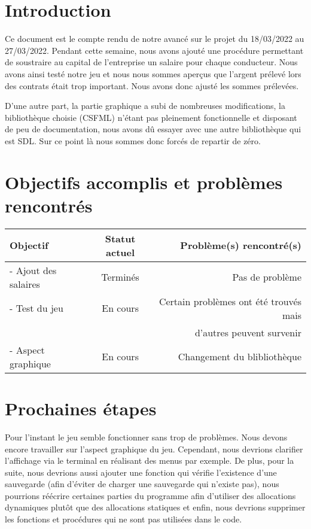 \documentclass[a4paper, 12pt]{article}
\begin{document}
\newpage



\section*{Introduction}
      Ce document est le compte rendu de notre avancé sur le projet du 18/03/2022 au 27/03/2022. Pendant cette semaine, nous avons ajouté une procédure permettant de soustraire au capital de l'entreprise un salaire pour chaque conducteur. Nous avons ainsi testé notre jeu et nous nous sommes aperçus que l'argent prélevé lors des contrats était trop important. Nous avons donc ajusté les sommes prélevées.

      D'une autre part, la partie graphique a subi de nombreuses modifications, la bibliothèque choisie (CSFML) n'étant pas pleinement fonctionnelle et disposant de peu de documentation, nous avons dû essayer avec une autre bibliothèque qui est SDL. Sur ce point là nous sommes donc forcés de repartir de zéro. 

\section{Objectifs accomplis et problèmes rencontrés}
     \begin{tabular}{|l|c|r|}
  \hline
  Objectif & Statut actuel & Problème(s) rencontré(s) \\
  \hline
   - Ajout des salaires & Terminés & Pas de problème \\
   - Test du jeu & En cours & Certain problèmes ont été trouvés mais \\
    &  & d'autres peuvent survenir \\
     - Aspect graphique & En cours & Changement du blibliothèque \\
  
  

  \hline
\end{tabular}
\section{Prochaines étapes}
    Pour l'instant le jeu semble fonctionner sans trop de problèmes. Nous devons encore travailler sur l'aspect graphique du jeu. Cependant, nous devrions clarifier l'affichage via le terminal en réalisant des menus par exemple. De plus, pour la suite, nous devrions aussi ajouter une fonction qui vérifie l'existence d'une sauvegarde (afin d'éviter de charger une sauvegarde qui n'existe pas), nous pourrions réécrire certaines parties du programme afin d'utiliser des allocations dynamiques plutôt que des allocations statiques et enfin, nous devrions supprimer les fonctions et procédures qui ne sont pas utilisées dans le code. 
    
\end{document}
